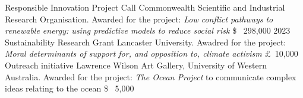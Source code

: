 

\begin{cvhonors}
    \cvhonor
    {Responsible Innovation Project Call}
    {Commonwealth Scientific and Industrial Research Organisation.\linebreak
    Awarded for the project: \textit{Low conflict pathways to renewable energy: using predictive models to reduce social risk}} %
    {\$ \ 298,000} %
    {2023} %
    \cvhonor
    {Sustainability Research Grant}
    {Lancaster University.\linebreak
    Awadred for the project: \textit{Moral determinants of support for, and opposition to, climate activism}} %
    {\pounds\ 10,000} %
    {} %
    \cvhonor
    {Outreach initiative}
    {Lawrence Wilson Art Gallery, University of Western Australia.\linebreak
    Awarded for the project: \textit{The Ocean Project} to communicate complex ideas relating to the ocean} %
    {\$ \ 5,000} %
    {} %
\end{cvhonors}


